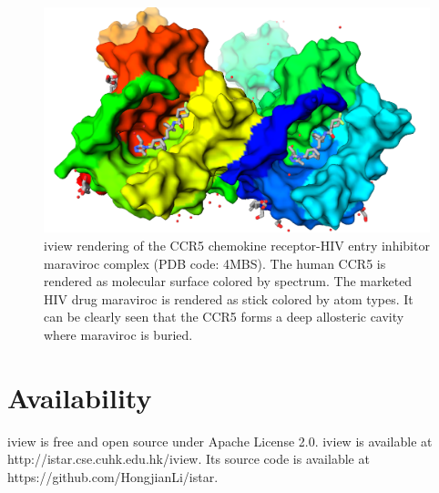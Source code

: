 \documentclass{bioinfo}
\begin{document}
\begin{figure}%
\centerline{\includegraphics[width=\linewidth]{4MBS.png}}
\caption{iview rendering of the CCR5 chemokine receptor-HIV entry inhibitor maraviroc complex (PDB code: 4MBS). The human CCR5 is rendered as molecular surface colored by spectrum. The marketed HIV drug maraviroc is rendered as stick colored by atom types. It can be clearly seen that the CCR5 forms a deep allosteric cavity where maraviroc is buried.}\label{fig:4MBS}
\end{figure}

\section{Availability}

iview is free and open source under Apache License 2.0. iview is available at http://istar.cse.cuhk.edu.hk/iview. Its source code is available at https://github.com/HongjianLi/istar.




%
%
%
%
%
%


\end{document}

